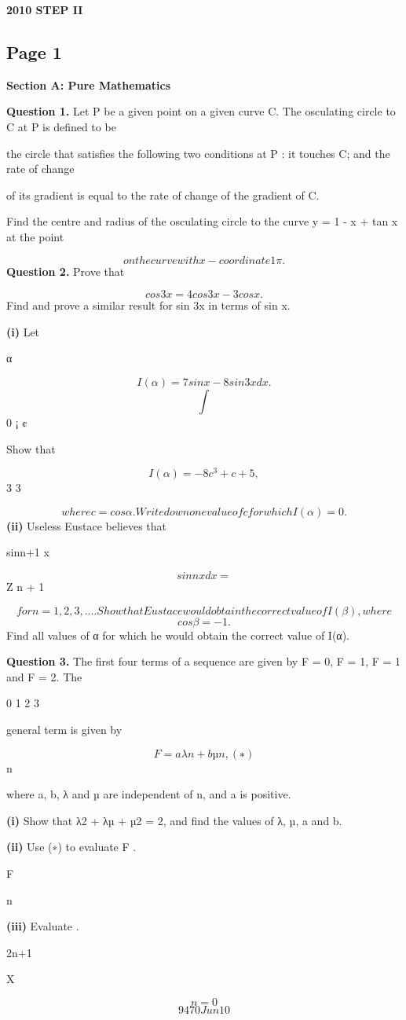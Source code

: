 \documentclass[12pt]{article}
\begin{document}
\begin{center}
{\Large \textbf{2010 STEP II}}
\end{center}

\subsection*{Page 1}
\begin{flushleft}
\bigskip\textbf{Section A: Pure Mathematics}\par
\bigskip\textbf{Question 1.} Let P be a given point on a given curve C. The osculating circle to C at P is defined to be\par
the circle that satisfies the following two conditions at P : it touches C; and the rate of change\par
of its gradient is equal to the rate of change of the gradient of C.\par
Find the centre and radius of the osculating circle to the curve y = 1 - x + tan x at the point\par
\[on the curve with x-coordinate 1 \pi.\]
\bigskip\textbf{Question 2.} Prove that\par
\[cos 3x = 4 cos3 x - 3 cos x .\]
Find and prove a similar result for sin 3x in terms of sin x.\par
\textbf{(i)} Let\par
α\par
\[I(α) = 7 sin x - 8 sin3 x dx .\]
\[\int\]
0 ¡ ¢\par
Show that\par
\[I(α) = - 8 c^3 + c + 5 ,\]
3 3\par
\[where c = cos α. Write down one value of c for which I(α) = 0.\]
\textbf{(ii)} Useless Eustace believes that\par
sinn+1 x\par
\[sinn x dx =\]
Z n + 1\par
\[for n = 1, 2, 3, . . . . Show that Eustace would obtain the correct value of I(β) , where\]
\[cos β = - 1 .\]
Find all values of α for which he would obtain the correct value of I(α).\par
\bigskip\textbf{Question 3.} The first four terms of a sequence are given by F = 0, F = 1, F = 1 and F = 2. The\par
0 1 2 3\par
general term is given by\par
\[F = aλn + bµn , (∗)\]
n\par
where a, b, λ and µ are independent of n, and a is positive.\par
\textbf{(i)} Show that λ2 + λµ + µ2 = 2, and find the values of λ, µ, a and b.\par
\textbf{(ii)} Use (∗) to evaluate F .\par
\infty\par
F\par
n\par
\textbf{(iii)} Evaluate .\par
2n+1\par
X\par
\[n=0\]
\[9470 Jun10\]
\end{flushleft}
\end{document}
